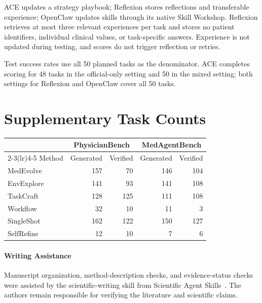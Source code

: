 \documentclass[11pt]{article}
\begin{document}
ACE updates a strategy playbook; Reflexion stores reflections and transferable experience; OpenClaw updates skills through its native Skill Workshop. Reflexion retrieves at most three relevant experiences per task and stores no patient identifiers, individual clinical values, or task-specific answers. Experience is not updated during testing, and scores do not trigger reflection or retries.

Test success rates use all 50 planned tasks as the denominator. ACE completes scoring for 48 tasks in the official-only setting and 50 in the mixed setting; both settings for Reflexion and OpenClaw cover all 50 tasks.

\newpage
\section{Supplementary Task Counts}
\label{app:counts}

\noindent\begin{minipage}{\columnwidth}
\centering
\small
{}
\label{tab:counts}
\setlength{\tabcolsep}{2pt}
\renewcommand{\arraystretch}{1.12}
\begin{tabular*}{\columnwidth}{@{\extracolsep{\fill}}lrrrr@{}}
\toprule
 & \multicolumn{2}{c}{PhysicianBench} & \multicolumn{2}{c}{MedAgentBench} \\
\cmidrule(lr){2-3}\cmidrule(lr){4-5}
Method & Generated & Verified & Generated & Verified \\
\midrule
MedEvolve & 157 & 70 & 146 & 104 \\
EnvExplore & 141 & 93 & 141 & 108 \\
TaskCraft & 128 & 125 & 111 & 108 \\
Workflow & 32 & 10 & 11 & 3 \\
SingleShot & 162 & 122 & 150 & 127 \\
SelfRefine & 12 & 10 & 7 & 6 \\
\bottomrule
\end{tabular*}
\end{minipage}
\par\medskip

\paragraph{Writing Assistance}
Manuscript organization, method-description checks, and evidence-status checks were assisted by the scientific-writing skill from Scientific Agent Skills~\citep{kassis2026skills}. The authors remain responsible for verifying the literature and scientific claims.
\end{document}
